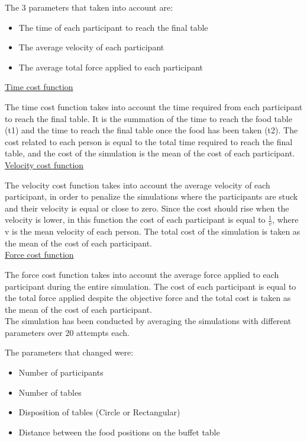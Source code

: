 \documentclass[11pt]{article}
\begin{document}
The 3 parameters that taken into account are:
\begin{itemize}
    \item The time of each participant to reach the final table
    \item The average velocity of each participant
    \item The average total force applied to each participant
\end{itemize}
\hfill\break
\underline{Time cost function}

The time cost function takes into account the time required from each participant to reach the final table. It is the summation of the time to reach the food table (t1) and the time to reach the final table once the food has been taken (t2). The cost related to each person is equal to the total time required to reach the final table, and the cost of the simulation is the mean of the cost of each participant.\\
\underline{Velocity cost function}

The velocity cost function takes into account the average velocity of each participant, in order to penalize the simulations where the participants are stuck and their velocity is equal or close to zero. Since the cost should rise when the velocity is lower, in this function the cost of each participant is equal to $\frac{1}{v}$, where v is the mean velocity of each person. The total cost of the simulation is taken as the mean of the cost of each participant.\\
\underline{Force cost function}

The force cost function takes into account the average force applied to each participant during the entire simulation. The cost of each participant is equal to the total force applied despite the objective force and the total cost is taken as the mean of the cost of each participant.\\

The simulation has been conducted by averaging the simulations with different parameters over 20 attempts each.

The parameters that changed were:
\begin{itemize}
    \item Number of participants
    \item Number of tables
    \item Disposition of tables (Circle or Rectangular)
    \item Distance between the food positions on the buffet table
\end{itemize}
\end{document}
